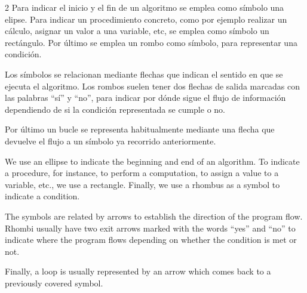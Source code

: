 \begin{figure}
\centering
{}
\label{fig:flujo}
\end{figure}

\begin{paracol}{2}
Para indicar el inicio y el fin de un algoritmo se emplea como símbolo una elipse. Para indicar un procedimiento concreto, como por ejemplo realizar un cálculo, asignar un valor a una variable, etc, se emplea como símbolo un rectángulo. Por último se emplea un rombo como símbolo, para representar una condición.

Los símbolos se relacionan mediante flechas que indican el sentido en que se ejecuta el algoritmo. Los rombos suelen tener dos flechas de salida marcadas con las palabras ``sí'' y ``no'', para indicar por dónde sigue el flujo de información dependiendo de si la condición representada se cumple o no.

Por último un bucle se representa habitualmente mediante una flecha que devuelve el flujo a un símbolo ya recorrido anteriormente.

\switchcolumn
We use an ellipse to indicate the beginning and end of an algorithm. To indicate a procedure, for instance, to perform a computation, to assign a value to a variable, etc., we use a rectangle. Finally, we use a rhombus as a symbol to indicate a condition. 

The symbols are related by arrows to establish the direction of the program flow. Rhombi usually have two exit arrows marked with the words ``yes'' and ``no'' to indicate where the program flows depending on whether the condition is met or not.

Finally, a loop is usually represented by an arrow which comes back to a previously covered symbol. 
\end{paracol}
 

